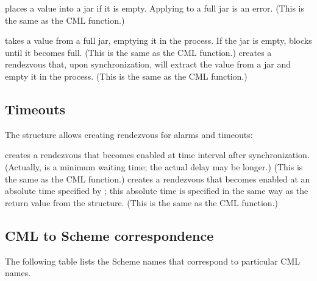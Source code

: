 \begin{protos}
\end{protos}
%
 places a value into a jar if it is empty.  Applying
 to a full jar is an error.  (This is the same as the
CML  function.)
%
\begin{protos}
\end{protos}
%
 takes a value from a full jar, emptying it in the
process.  If the jar is empty,  blocks until it becomes
full.  (This is the same as the CML  function.)
 creates a rendezvous that, upon synchronization,
will extract the value from a jar and empty it in the process.  (This
is the same as the CML  function.)

\subsection{Timeouts}

The  structure allows creating rendezvous for
alarms and timeouts:
%
\begin{protos}
\end{protos}
%
 creates a rendezvous that becomes enabled at time
interval  after synchronization.  (Actually,
 is a minimum waiting time; the actual delay may be
longer.)  (This is the same as the CML  function.)
 creates a rendezvous that becomes enabled at an
absolute time specified by ; this absolute time is
specified in the same way as the return value  from
the  structure.  (This is the same as the CML
 function.)

\subsection{CML to Scheme correspondence}

The following table lists the Scheme names that correspond to
particular CML names.

